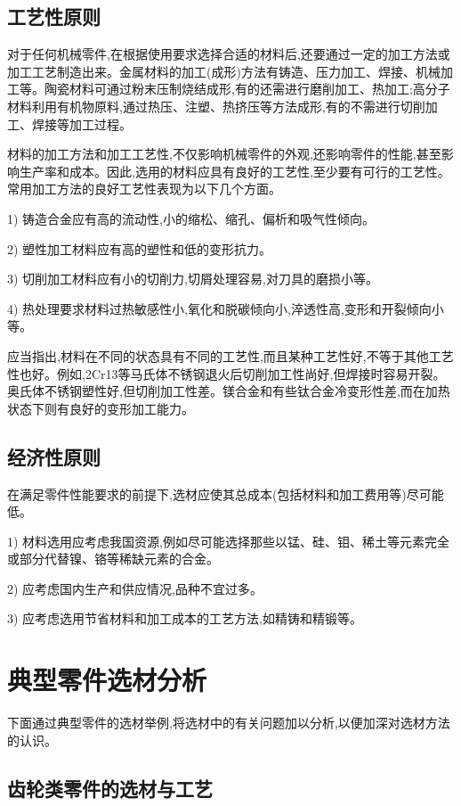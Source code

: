 \documentclass[UTF8]{ctexbook}
\newcommand{\◎}{\ensuremath{\bigcirc}}
\begin{document}
\subsection{工艺性原则}

对于任何机械零件,在根据使用要求选择合适的材料后,还要通过一定的加工方法或加工工艺制造出来。金属材料的加工(成形)方法有铸造、压力加工、焊接、机械加工等。陶瓷材料可通过粉末压制烧结成形,有的还需进行磨削加工、热加工;高分子材料利用有机物原料,通过热压、注塑、热挤压等方法成形,有的不需进行切削加工、焊接等加工过程。

材料的加工方法和加工工艺性,不仅影响机械零件的外观,还影响零件的性能,甚至影响生产率和成本。因此,选用的材料应具有良好的工艺性,至少要有可行的工艺性。常用加工方法的良好工艺性表现为以下几个方面。

1) 铸造合金应有高的流动性,小的缩松、缩孔、偏析和吸气性倾向。

2) 塑性加工材料应有高的塑性和低的变形抗力。

3) 切削加工材料应有小的切削力,切屑处理容易,对刀具的磨损小等。

4) 热处理要求材料过热敏感性小,氧化和脱碳倾向小,淬透性高,变形和开裂倾向小等。

应当指出,材料在不同的状态具有不同的工艺性,而且某种工艺性好,不等于其他工艺性也好。例如,2Cr13等马氏体不锈钢退火后切削加工性尚好,但焊接时容易开裂。奥氏体不锈钢塑性好,但切削加工性差。镁合金和有些钛合金冷变形性差,而在加热状态下则有良好的变形加工能力。

\subsection{经济性原则}

在满足零件性能要求的前提下,选材应使其总成本(包括材料和加工费用等)尽可能低。

1) 材料选用应考虑我国资源,例如尽可能选择那些以锰、硅、钼、稀土等元素完全或部分代替镍、铬等稀缺元素的合金。

2) 应考虑国内生产和供应情况,品种不宜过多。

3) 应考虑选用节省材料和加工成本的工艺方法,如精铸和精锻等。

\section{典型零件选材分析}

下面通过典型零件的选材举例,将选材中的有关问题加以分析,以便加深对选材方法的认识。

\subsection{齿轮类零件的选材与工艺}
\end{document}
